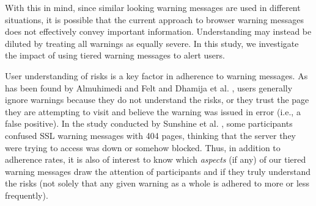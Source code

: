 With this in mind, since similar looking warning messages are used in different situations, it is possible that the current approach to browser warning messages does not effectively convey important information. Understanding may instead be diluted by treating all warnings as equally severe. In this study, we investigate the impact of using tiered warning messages to alert users.

User understanding of risks is a key factor in adherence to warning messages. As has been found by Almuhimedi and Felt \cite{almuhimedi2014reputation} and Dhamija et al. \cite{dhamija2006phishing}, users generally ignore warnings because they do not understand the risks, or they trust the page they are attempting to visit and believe the warning was issued in error (i.e., a false positive). In the study conducted by Sunshine et al. \cite{sunshine2009crying}, some participants confused SSL warning messages with 404 pages, thinking that the server they were trying to access was down or somehow blocked. Thus, in addition to adherence rates, it is also of interest to know which \emph{aspects} (if any) of our tiered warning messages draw the attention of participants and if they truly understand the risks (not solely that any given warning as a whole is adhered to more or less frequently).
